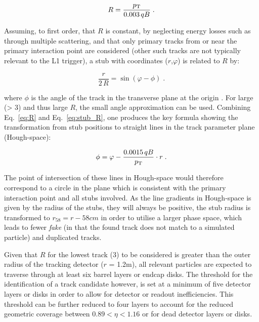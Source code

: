 \begin{equation}
R = \frac{p_{\mathrm{T}}}{0.003\,qB} \;.
\label{eq:R}
\end{equation}

Assuming, to first order, that $R$ is constant, by neglecting energy losses such as through multiple scattering, and that only primary tracks from or near the primary interaction point are considered (other such tracks are not typically relevant to the L1 trigger), a stub with coordinates ($r$,$\varphi$) is related to $R$ by:

\begin{equation}
\frac r{2\,R} = \sin\left(\varphi-\phi\right) \;.
\label{eq:stub_R}
\end{equation}

where $\phi$ is the angle of the track in the transverse plane at the origin \cite{markthesis}. 
For large \pT (> 3\GeV) and thus large $R$, the small angle approximation can be used. Combining Eq.~\ref{eq:R} and Eq.~\ref{eq:stub_R}, one produces the key formula showing the transformation from stub positions to straight lines in the track parameter plane (Hough-space):

\begin{equation}
\phi = \varphi - \frac{0.0015\,qB}{p_{\mathrm{T}}}\cdot r \;.
\label{eq:localHT}
\end{equation}

The point of intersection of these lines in Hough-space would therefore correspond to a circle in the \rphi plane which is consistent with the primary interaction point and all stubs involved.
As the line gradients in Hough-space is given by the radius of the stubs, they will always be positive, the stub radius is transformed to $r_{58} = r - 58cm$ in order to utilise a larger phase space, which leads to fewer \textit{fake} (in that the found track does not match to a simulated particle) and duplicated tracks.

Given that $R$ for the lowest \pT track (3\GeV) to be considered is greater than the outer radius of the tracking detector ($r$ = 1.2m), all relevant particles are expected to traverse through at least six barrel layers or endcap disks. 
The threshold for the identification of a track candidate however, is set at a minimum of five detector layers or disks in order to allow for detector or readout inefficiencies. 
This threshold can be further reduced to four layers to account for the reduced geometric coverage between $0.89 < \eta < 1.16$ or for dead detector layers or disks.

